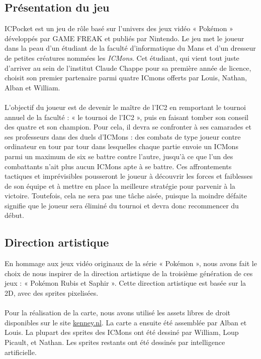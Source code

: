 \documentclass[12pt,a4paper, twoside]{article}
\begin{document}
    \subsection{Présentation du jeu}
        ICPocket est un jeu de rôle basé sur l'univers des jeux vidéo « Pokémon » développés par GAME FREAK et publiés par Nintendo.
        Le jeu met le joueur dans la peau d'un étudiant de la faculté d'informatique du Mans et d'un dresseur de petites créatures nommées les \emph{ICMons}.
        Cet étudiant, qui vient tout juste d'arriver au sein de l'institut Claude Chappe pour sa première année de licence, choisit son premier partenaire parmi quatre ICmons offerts par Louis, Nathan, Alban et William.
        \paragraph{}L'objectif du joueur est de devenir le maître de l'IC2 en remportant le tournoi annuel de la faculté : « le tournoi de l'IC2 », puis en faisant tomber son conseil des quatre et son champion. Pour cela, il devra se confronter à ses camarades et ses professeurs dans des duels d'ICMons : 
        des combats de type joueur contre ordinateur en tour par tour dans lesquelles chaque partie envoie un ICMons parmi un maximum de six se battre contre l'autre, jusqu'à ce que l'un des combattants n'ait plus aucun ICMons apte à se battre.
        Ces affrontements tactiques et imprévisibles pousseront le joueur à découvrir les forces et faiblesses de son équipe et à mettre en place la meilleure stratégie pour parvenir à la victoire.
        Toutefois, cela ne sera pas une tâche aisée, puisque la moindre défaite signifie que le joueur sera éliminé du tournoi et devra donc recommencer du début.

    \subsection{Direction artistique}
        En hommage aux jeux vidéo originaux de la série « Pokémon », nous avons fait le choix de nous inspirer de la direction artistique de la troisième génération de ces jeux : « Pokémon Rubis et Saphir ».
        Cette direction artistique est basée sur la 2D, avec des sprites pixelisées. \paragraph{} Pour la réalisation de la carte, nous avons utilisé les assets libres de droit disponibles sur le site \href{https://kenney.nl/assets}{kenney.nl}. La carte a ensuite été assemblée par Alban et Louis. La plupart des sprites des ICMons ont été dessiné par William, Loup Picault, et Nathan. Les sprites restants ont été dessinés par intelligence artificielle.
\end{document}
